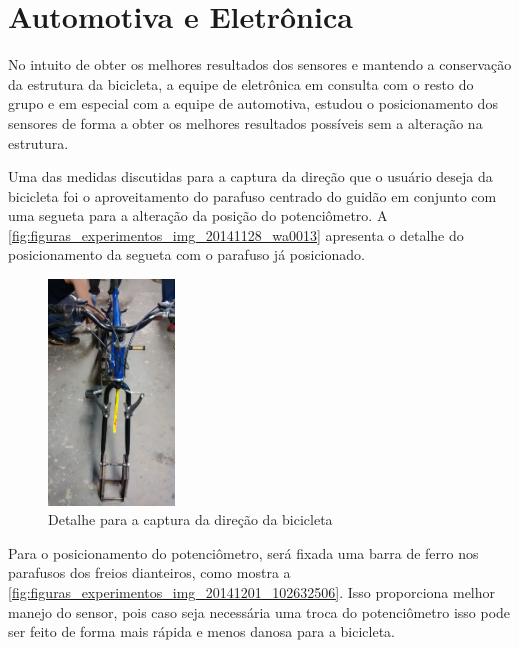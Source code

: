 
\section{Automotiva e Eletrônica} %
\label{sec:automotiva_e_eletr_nica}

No intuito de obter os melhores resultados dos sensores e mantendo a conservação da estrutura da bicicleta, a equipe de eletrônica em consulta com o resto do grupo e em especial com a equipe de automotiva, estudou o posicionamento dos sensores de forma a obter os melhores resultados  possíveis sem a alteração na estrutura.

Uma das medidas discutidas para a captura da direção que o usuário deseja da bicicleta foi o aproveitamento do parafuso centrado do guidão em conjunto com uma segueta para a alteração da posição do potenciômetro. A \autoref{fig:figuras_experimentos_img_20141128_wa0013} apresenta o detalhe do posicionamento da segueta com o parafuso já posicionado.

\begin{figure}[h]
  \centering
	\includegraphics[width=0.3\textwidth]{figuras/experimentos/IMG-20141128-WA0013}
  \caption{Detalhe para a captura da direção da bicicleta}
  \label{fig:figuras_experimentos_img_20141128_wa0013}
\end{figure}

Para o posicionamento do potenciômetro, será fixada uma barra de ferro nos parafusos dos freios dianteiros, como mostra a \autoref{fig:figuras_experimentos_img_20141201_102632506}. Isso proporciona melhor manejo do sensor, pois caso seja necessária uma troca do potenciômetro isso pode ser feito de forma mais rápida e menos danosa para a bicicleta.


